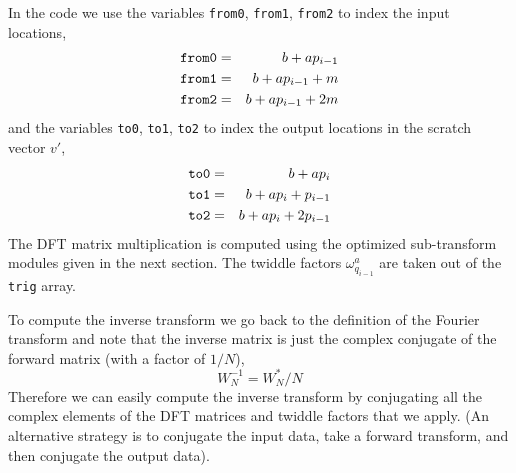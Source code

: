 \documentclass[fleqn,12pt]{article}
\newenvironment{algorithm}{\begin{quote} %
\begin{algorithmic}\samepage}{\end{algorithmic} %
\end{quote}}
\begin{document}
\begin{algorithm}
\ENDFOR
\ENDFOR
\end{algorithm}
%
In the code we use the variables {\tt from0}, {\tt from1}, {\tt from2}
to index the input locations,
%
\begin{eqnarray}
\mbox{\tt from0} &=& b + a p_{i-1} \\
\mbox{\tt from1} &=& b + a p_{i-1} + m \\
\mbox{\tt from2} &=& b + a p_{i-1} + 2m
\end{eqnarray}
%
and the variables {\tt to0}, {\tt to1}, {\tt to2} to index the output
locations in the scratch vector $v'$,
%
\begin{eqnarray}
\mbox{\tt to0} &=& b + a p_{i} \\
\mbox{\tt to1} &=& b + a p_{i} + p_{i-1} \\
\mbox{\tt to2} &=& b + a p_{i} + 2 p_{i-1}
\end{eqnarray}
%
The DFT matrix multiplication is computed using the optimized
sub-transform modules given in the next section. The twiddle factors
$\omega^a_{q_{i-1}}$ are taken out of the {\tt trig} array.

To compute the inverse transform we go back to the definition of the
Fourier transform and note that the inverse matrix is just the complex
conjugate of the forward matrix (with a factor of $1/N$),
%
\begin{equation}
W^{-1}_N = W^*_N / N 
\end{equation}
%
Therefore we can easily compute the inverse transform by conjugating
all the complex elements of the DFT matrices and twiddle factors that
we apply. (An alternative strategy is to conjugate the input data,
take a forward transform, and then conjugate the output data).
\end{document}
